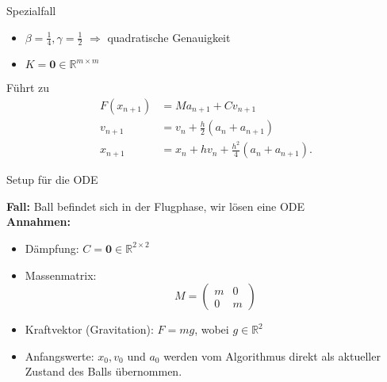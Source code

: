 \documentclass[aspectratio=169]{beamer}
\begin{document}
\begin{frame}{Spezialfall}

\begin{itemize}
	\item  $\beta = \frac{1}{4}, \gamma = \frac{1}{2}$ $\Rightarrow$ quadratische Genauigkeit
	\item $K = \mathbf{0} \in \mathbb{R}^{m \times m}$
\end{itemize}
Führt zu
\begin{align*}
	F(x_{n+1}) &= M a_{n+1} + C v_{n+1}\\
	v_{n+1} &= v_n + \frac{h}{2} (a_n + a_{n+1})\\
	x_{n+1} &= x_n + h v_n + \frac{h^2}{4} (a_n + a_{n+1}).
\end{align*}

\end{frame}

\begin{frame}{Setup für die ODE}

\textbf{Fall:} Ball befindet sich in der Flugphase, wir lösen eine ODE\\
\vspace{0.3cm}
\textbf{Annahmen:}
	\begin{itemize}
		\item Dämpfung: $C = \mathbf{0} \in \mathbb{R}^{2 \times 2}$
		\item Massenmatrix:
		\[
		M =
		\begin{pmatrix}
			m & 0 \\
			0 & m
		\end{pmatrix}
		\]
		\item Kraftvektor (Gravitation): \quad $F = m g$, \quad wobei $g \in \mathbb{R}^2$
		\item Anfangswerte: $x_0, v_0$ und $a_0$ werden vom Algorithmus direkt als aktueller Zustand des Balls übernommen.
	\end{itemize}

\end{frame}
\end{document}
